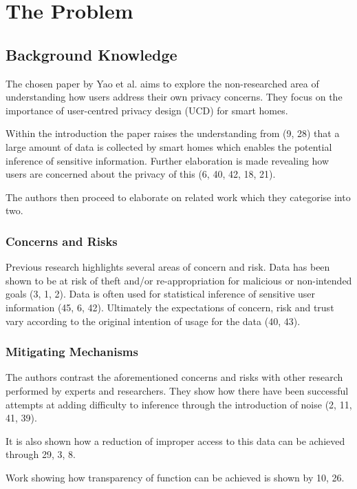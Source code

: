 \section{The Problem}

\subsection{Background Knowledge}

The chosen paper by Yao et al. \parencite*{Yao:2019:DMC:3290605.3300428} aims to explore the non-researched area of understanding how users address their own privacy concerns. They focus on the importance of user-centred privacy design (UCD) for smart homes. 


Within the introduction the paper raises the understanding from (9, 28) that a large amount of data is collected by smart homes which enables the potential inference of sensitive information. Further elaboration is made revealing how users are concerned about the privacy of this (6, 40, 42, 18, 21).

The authors then proceed to elaborate on related work which they categorise into two.

\subsubsection{Concerns and Risks}

Previous research highlights several areas of concern and risk.
Data has been shown to be at risk of theft and/or re-appropriation for malicious or non-intended goals (3, 1, 2). Data is often used for statistical inference of sensitive user information (45, 6, 42). Ultimately the expectations of concern, risk and trust vary according to the original intention of usage for the data (40, 43).
	
\subsubsection{Mitigating Mechanisms}

The authors contrast the aforementioned concerns and risks with other research performed by experts and researchers. They show how there have been successful attempts at adding difficulty to inference through the introduction of noise (2, 11, 41, 39).

It is also shown how a reduction of improper access to this data can be achieved through 29, 3, 8.

Work showing how transparency of function can be achieved is shown by 10, 26.

